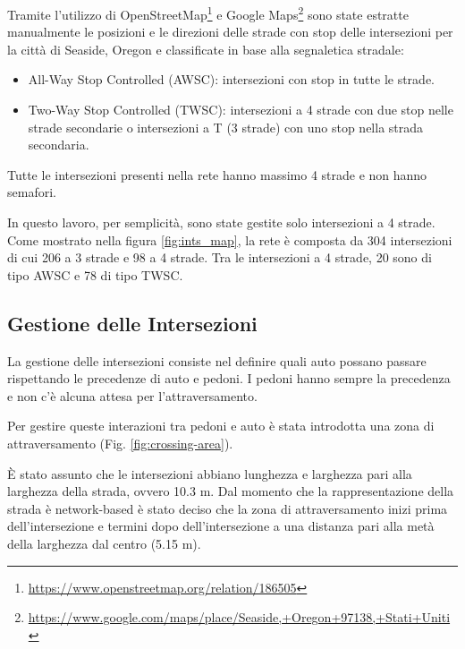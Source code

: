 Tramite l'utilizzo di OpenStreetMap\footnote{\url{https://www.openstreetmap.org/relation/186505}} e Google Maps\footnote{\url{https://www.google.com/maps/place/Seaside,+Oregon+97138,+Stati+Uniti}} sono state estratte manualmente le posizioni e le direzioni delle strade con stop
delle intersezioni per la città di Seaside, Oregon e classificate in base alla segnaletica stradale:

\begin{itemize}
    \item All-Way Stop Controlled (AWSC): intersezioni con stop in tutte le strade.
    \item Two-Way Stop Controlled (TWSC): intersezioni a 4 strade con due stop nelle strade secondarie o intersezioni a T (3 strade) con uno stop nella strada secondaria.
\end{itemize}
Tutte le intersezioni presenti nella rete hanno massimo 4 strade e non hanno semafori.

In questo lavoro, per semplicità, sono state gestite solo intersezioni a 4 strade.
Come mostrato nella figura \ref{fig:ints_map}, la rete è composta da 304 intersezioni
di cui 206 a 3 strade e 98 a 4 strade. Tra le intersezioni a 4 strade, 20 sono di tipo AWSC e 78 di tipo TWSC.

\subsection{Gestione delle Intersezioni}
La gestione delle intersezioni consiste nel definire quali auto possano passare rispettando le precedenze di auto e pedoni.
I pedoni hanno sempre la precedenza e non c'è alcuna attesa per l'attraversamento.

Per gestire queste interazioni tra pedoni e auto è stata introdotta una zona di attraversamento (Fig. \ref{fig:crossing-area}).


È stato assunto che le intersezioni abbiano lunghezza e larghezza pari alla larghezza della strada, ovvero 10.3 m.
Dal momento che la rappresentazione della strada è network-based è stato deciso che
la zona di attraversamento inizi prima dell'intersezione e termini dopo dell'intersezione a una distanza pari alla metà della larghezza dal centro (5.15 m).

